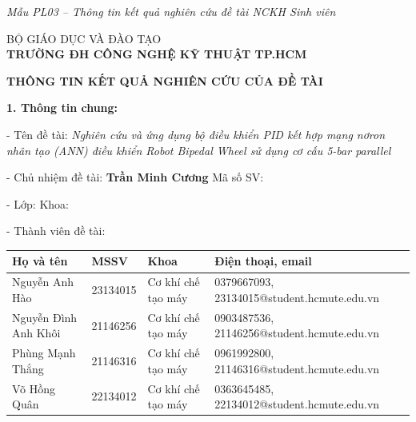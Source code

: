 
{}

{\fontsize{13pt}{15pt}\selectfont

\begin{center}
{\small\itshape Mẫu PL03 -- Thông tin kết quả nghiên cứu đề tài NCKH Sinh viên}
\end{center}

\vspace{0.2cm}
\noindent BỘ GIÁO DỤC VÀ ĐÀO TẠO\\[0.05cm]
\noindent\textbf{TRƯỜNG ĐH CÔNG NGHỆ KỸ THUẬT TP.HCM}

\vspace{0.3cm}
\begin{center}
    {\bfseries THÔNG TIN KẾT QUẢ NGHIÊN CỨU CỦA ĐỀ TÀI}
\end{center}

\vspace{0.1cm}
\noindent\textbf{1. Thông tin chung:}

\vspace{0.1cm}
\noindent- Tên đề tài: \textit{Nghiên cứu và ứng dụng bộ điều khiển PID kết hợp mạng nơron nhân tạo (ANN) điều khiển Robot Bipedal Wheel sử dụng cơ cấu 5-bar parallel}

\vspace{0.15cm}
\noindent- Chủ nhiệm đề tài: \textbf{Trần Minh Cương} \hfill Mã số SV: \underline{\hspace{3cm}}

\vspace{0.1cm}
\noindent- Lớp: \underline{\hspace{3.5cm}} \hfill Khoa: \underline{\hspace{5cm}}

\vspace{0.2cm}
\noindent- Thành viên đề tài:

\vspace{0.15cm}
\begin{tabular}{|p{4cm}|p{2.2cm}|p{3.5cm}|p{3.8cm}|}
\hline
\textbf{Họ và tên} & \textbf{MSSV} & \textbf{Khoa} & \textbf{Điện thoại, email} \\
\hline
Nguyễn Anh Hào & 23134015 & Cơ khí chế tạo máy & 0379667093, 23134015@student.hcmute.edu.vn \\
\hline
Nguyễn Đình Anh Khôi & 21146256 & Cơ khí chế tạo máy & 0903487536, 21146256@student.hcmute.edu.vn \\
\hline
Phùng Mạnh Thắng & 21146316 & Cơ khí chế tạo máy & 0961992800, 21146316@student.hcmute.edu.vn \\
\hline
Võ Hồng Quân & 22134012 & Cơ khí chế tạo máy & 0363645485, 22134012@student.hcmute.edu.vn \\
\hline
\end{tabular}

}
